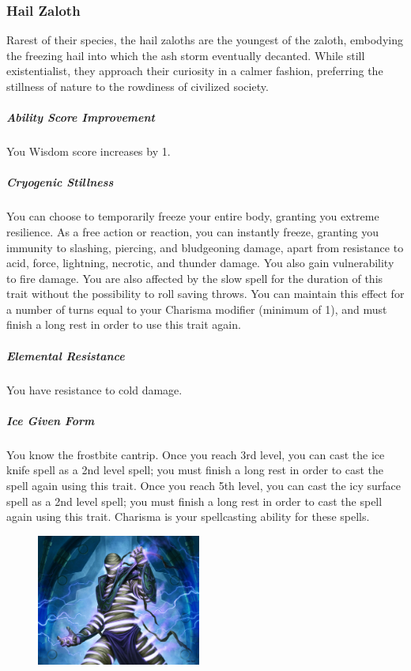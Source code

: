 \begin{linenumbers}
\subsubsection{Hail Zaloth}
Rarest of their species, the hail zaloths are the youngest of the zaloth, embodying the freezing hail into which the ash storm eventually decanted.
While still existentialist, they approach their curiosity in a calmer fashion, preferring the stillness of nature to the rowdiness of civilized society.
\subparagraph{Ability Score Improvement} You Wisdom score increases by 1.
\subparagraph{Cryogenic Stillness} You can choose to temporarily freeze your entire body, granting you extreme resilience.
As a free action or reaction, you can instantly freeze, granting you immunity to slashing, piercing, and bludgeoning damage, apart from resistance to acid, force, lightning, necrotic, and thunder damage.
You also gain vulnerability to fire damage.
You are also affected by the slow spell for the duration of this trait without the possibility to roll saving throws.
You can maintain this effect for a number of turns equal to your Charisma modifier (minimum of 1), and must finish a long rest in order to use this trait again.
\subparagraph{Elemental Resistance} You have resistance to cold damage.
\subparagraph{Ice Given Form} You know the frostbite cantrip.
Once you reach 3rd level, you can cast the ice knife spell as a 2nd level spell; you must finish a long rest in order to cast the spell again using this trait.
Once you reach 5th level, you can cast the icy surface spell as a 2nd level spell; you must finish a long rest in order to cast the spell again using this trait.
Charisma is your spellcasting ability for these spells.

\begin{figure}[!b]
    \centering
    \includegraphics[width=0.48\textwidth]{02kins/img/20zaloth_thunder.jpg}
\end{figure}

\end{linenumbers}
